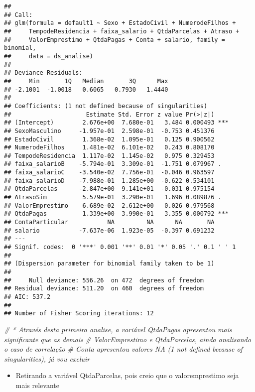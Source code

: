 \documentclass[
]{article}
\newenvironment{Shaded}{\begin{snugshade}}{\end{snugshade}}
\newcommand{\CommentTok}[1]{\textcolor[rgb]{0.56,0.35,0.01}{\textit{#1}}}
\providecommand{\tightlist}{%
  \setlength{\itemsep}{0pt}\setlength{\parskip}{0pt}}
\begin{document}
\begin{verbatim}
## 
## Call:
## glm(formula = default1 ~ Sexo + EstadoCivil + NumerodeFilhos + 
##     TempodeResidencia + faixa_salario + QtdaParcelas + Atraso + 
##     ValorEmprestimo + QtdaPagas + Conta + salario, family = binomial, 
##     data = ds_analise)
## 
## Deviance Residuals: 
##     Min       1Q   Median       3Q      Max  
## -2.1001  -1.0018   0.6065   0.7930   1.4440  
## 
## Coefficients: (1 not defined because of singularities)
##                     Estimate Std. Error z value Pr(>|z|)    
## (Intercept)        2.676e+00  7.680e-01   3.484 0.000493 ***
## SexoMasculino     -1.957e-01  2.598e-01  -0.753 0.451376    
## EstadoCivil        1.368e-02  1.095e-01   0.125 0.900562    
## NumerodeFilhos     1.481e-02  6.101e-02   0.243 0.808170    
## TempodeResidencia  1.117e-02  1.145e-02   0.975 0.329453    
## faixa_salarioB    -5.794e-01  3.309e-01  -1.751 0.079967 .  
## faixa_salarioC    -3.540e-02  7.756e-01  -0.046 0.963597    
## faixa_salarioD    -7.988e-01  1.285e+00  -0.622 0.534101    
## QtdaParcelas      -2.847e+00  9.141e+01  -0.031 0.975154    
## AtrasoSim          5.579e-01  3.290e-01   1.696 0.089876 .  
## ValorEmprestimo    6.689e-02  2.612e+00   0.026 0.979568    
## QtdaPagas          1.339e+00  3.990e-01   3.355 0.000792 ***
## ContaParticular           NA         NA      NA       NA    
## salario           -7.637e-06  1.923e-05  -0.397 0.691232    
## ---
## Signif. codes:  0 '***' 0.001 '**' 0.01 '*' 0.05 '.' 0.1 ' ' 1
## 
## (Dispersion parameter for binomial family taken to be 1)
## 
##     Null deviance: 556.26  on 472  degrees of freedom
## Residual deviance: 511.20  on 460  degrees of freedom
## AIC: 537.2
## 
## Number of Fisher Scoring iterations: 12
\end{verbatim}

\begin{Shaded}
\begin{Highlighting}[]
\CommentTok{\# * Através desta  primeira analise, a variável QtdaPagas apresentou mais significante que as demais}
\CommentTok{\# ValorEmprestimo e QtdaParcelas, ainda analisando o caso de correlação}
\CommentTok{\# Conta apresentou valores NA (1 not defined because of singularities), já vou excluir}
\end{Highlighting}
\end{Shaded}

\begin{itemize}
\tightlist
\item
  Retirando a variável QtdaParcelas, pois creio que o valoremprestimo
  seja mais relevante
\end{itemize}
\end{document}
